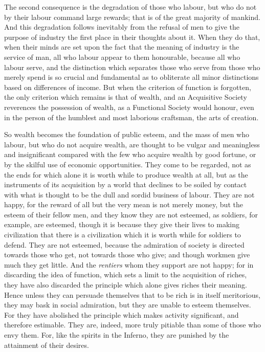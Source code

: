 \documentclass{book}
\begin{document}
The second consequence is the degradation of those who labour, but who do not by their labour command large rewards; that is of the great majority of mankind. And this degradation follows inevitably from the refusal of men to give the purpose of industry the first place in their thoughts about it. When they do that, when their minds are set upon the fact that the meaning of industry is the service of man, all who labour appear to them honourable, because all who labour serve, and the distinction which separates those who serve from those who merely spend is so crucial and fundamental as to obliterate all minor distinctions based on differences of income. But when the criterion of function is forgotten, the only criterion which remains is that of wealth, and an Acquisitive Society reverences the possession of wealth, as a Functional Society would honour, even in the person of the humblest and most laborious craftsman, the arts of creation.

So wealth becomes the foundation of public esteem, and the mass of men who labour, but who do not acquire wealth, are thought to be vulgar and meaningless and insignificant compared with the few who acquire wealth by good fortune, or by the skilful use of economic opportunities. They come to be regarded, not as the ends for which alone it is worth while to produce wealth at all, but as the instruments of its acquisition by a world that declines to be soiled by contact with what is thought to be the dull and sordid business of labour. They are not happy, for the reward of all but the very mean is not merely money, but the esteem of their fellow men, and they know they are not esteemed, as soldiers, for example, are esteemed, though it is because they give their lives to making civilization that there is a civilization which it is worth while for soldiers to defend. They are not esteemed, because the admiration of society is directed towards those who get, not towards those who give; and though workmen give much they get little. And the \emph{rentiers} whom they support are not happy; for in discarding the idea of function, which sets a limit to the acquisition of riches, they have also discarded the principle which alone gives riches their meaning. Hence unless they can persuade themselves that to be rich is in itself meritorious, they may bask in social admiration, but they are unable to esteem themselves. For they have abolished the principle which makes activity significant, and therefore estimable. They are, indeed, more truly pitiable than some of those who envy them. For, like the spirits in the Inferno, they are punished by the attainment of their desires.
\end{document}
